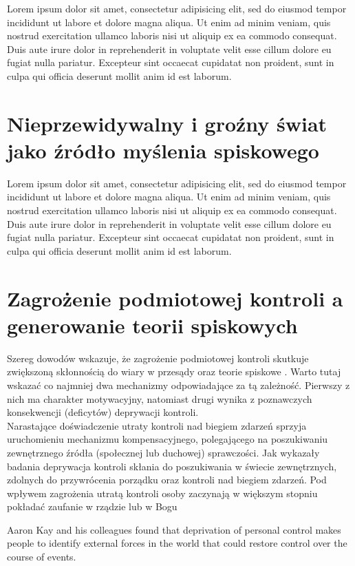 \documentclass[man]{apa6}
\begin{document}
    Lorem ipsum dolor sit amet, consectetur adipisicing elit, sed do eiusmod tempor incididunt ut labore et dolore magna aliqua. Ut enim ad minim veniam, quis nostrud exercitation ullamco laboris nisi ut aliquip ex ea commodo consequat. Duis aute irure dolor in reprehenderit in voluptate velit esse cillum dolore eu fugiat nulla pariatur. Excepteur sint occaecat cupidatat non proident, sunt in culpa qui officia deserunt mollit anim id est laborum.

    \section{Nieprzewidywalny i groźny świat jako źródło myślenia spiskowego}

    Lorem ipsum dolor sit amet, consectetur adipisicing elit, sed do eiusmod tempor incididunt ut labore et dolore magna aliqua. Ut enim ad minim veniam, quis nostrud exercitation ullamco laboris nisi ut aliquip ex ea commodo consequat. Duis aute irure dolor in reprehenderit in voluptate velit esse cillum dolore eu fugiat nulla pariatur. Excepteur sint occaecat cupidatat non proident, sunt in culpa qui officia deserunt mollit anim id est laborum.

    \section{Zagrożenie podmiotowej kontroli a generowanie teorii spiskowych}

    Szereg dowodów wskazuje, że zagrożenie podmiotowej kontroli skutkuje zwiększoną skłonnością do wiary w przesądy oraz teorie spiskowe \parencite{whitson2008lacking}. Warto tutaj wskazać co najmniej dwa mechanizmy odpowiadające za tą zależność. Pierwszy z nich ma charakter motywacyjny, natomiast drugi wynika z poznawczych konsekwencji (deficytów) deprywacji kontroli.\\

    Narastające doświadczenie utraty kontroli nad biegiem zdarzeń sprzyja uruchomieniu mechanizmu kompensacyjnego, polegającego na poszukiwaniu zewnętrznego źródła (społecznej lub duchowej) sprawczości. Jak wykazały badania \textcite{kay2008god} deprywacja kontroli skłania do poszukiwania w świecie zewnętrznych, zdolnych do przywrócenia porządku oraz kontroli nad biegiem zdarzeń. Pod wpływem zagrożenia utratą kontroli osoby zaczynają w większym stopniu pokładać zaufanie w rządzie lub w Bogu

Aaron Kay and his colleagues found that deprivation of personal control makes people to identify external forces in the world that could restore control over the course of events.
\end{document}
